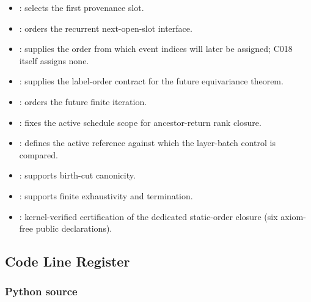 \begin{itemize}
\tightlist
\item
  \texttt{\protect{}}: selects the first
  provenance slot.
\item
  \texttt{\protect{}}: orders the recurrent
  next-open-slot interface.
\item
  \texttt{\protect{}}: supplies the order from
  which event indices will later be assigned; C018 itself assigns none.
\item
  \texttt{\protect{}}: supplies the label-order
  contract for the future equivariance theorem.
\item
  \texttt{\protect{}}: orders the future finite
  iteration.
\item
  \texttt{\protect{}}: fixes the active schedule
  scope for ancestor-return rank closure.
\item
  \texttt{\protect{}}: defines the active
  reference against which the layer-batch control is compared.
\item
  \texttt{\protect{}}: supports birth-cut
  canonicity.
\item
  \texttt{\protect{}}: supports finite
  exhaustivity and termination.
\item
  \texttt{\protect{}}: kernel-verified
  certification of the dedicated static-order closure (six axiom-free
  public declarations).
\end{itemize}

\subsection{Code Line Register}\label{code-line-register}

\subsubsection{Python source}\label{python-source-5}

